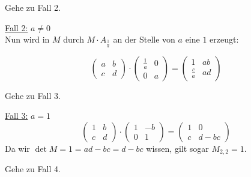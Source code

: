 \begin{beweis}
\begin{enumerate}[label=\alph*)]
              Gehe zu Fall 2.

              \underline{Fall 2:} $a \neq 0$\\
              Nun wird in $M$ durch $M \cdot A_{\frac{1}{a}}$ an der Stelle von
              $a$ eine $1$ erzeugt:

              \[\begin{pmatrix} a & b\\ c & d\end{pmatrix} \cdot \begin{pmatrix} \frac{1}{a} & 0\\ 0 & a\end{pmatrix} = \begin{pmatrix} 1 & ab\\ \frac{c}{a} & ad\end{pmatrix}\]

              Gehe zu Fall 3.

              \underline{Fall 3:} $a = 1$\\
              \[\begin{pmatrix} 1 & b\\ c & d\end{pmatrix} \cdot \begin{pmatrix} 1 & -b\\ 0 & 1\end{pmatrix} = \begin{pmatrix} 1 & 0\\ c & d-bc\end{pmatrix}\]
              Da wir $\det M = 1 = ad - bc = d - bc$ wissen, gilt sogar
              $M_{2,2} = 1$.

              Gehe zu Fall 4.


\end{enumerate}
\end{beweis}
